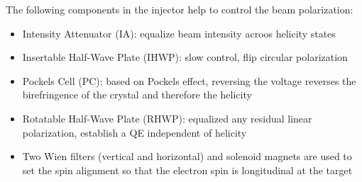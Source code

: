 \begin{figure}[h!]
\end{figure}
\begin{comment}
    1. what's the beam polarization before the Pockels cell? linearly or circularly
    polarized?
\end{comment}

The following components in the injector help to control the beam polarization:
\begin{itemize}
    \item Intensity Attenuator (IA): equalize beam intensity acroos helicity states
    \item Insertable Half-Wave Plate (IHWP): slow control, flip circular polarization
    \item Pockels Cell (PC): based on Pockels effect, reversing the voltage reverses
	the birefringence of the crystal and therefore the helicity
    \item Rotatable Half-Wave Plate (RHWP): equalized any residual linear polarization,
	establish a QE independent of helicity
    \item Two Wien filters (vertical and horizontal) and solenoid magnets are 
	used to set the spin alignment so that the electron spin is longitudinal 
	at the target
\end{itemize}

